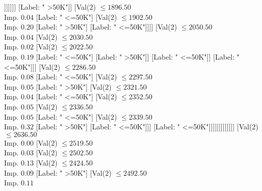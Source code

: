 \documentclass[margin=10pt]{standalone}
\begin{document}
\begin{forest}
																														[Label: " <=50K"]
																														[Val($2$) $ \leq 1851.50$ \\ Imp. $0.29$
																															[Label: " >50K"]
																															[Label: " <=50K"]]]]]]]
																									[Label: " >50K"]]
																								[Val($2$) $ \leq 1896.50$ \\ Imp. $0.04$
																									[Label: " <=50K"]
																									[Val($2$) $ \leq 1902.50$ \\ Imp. $0.20$
																										[Label: " >50K"]
																										[Label: " <=50K"]]]]
																							[Val($2$) $ \leq 2050.50$ \\ Imp. $0.04$
																								[Val($2$) $ \leq 2030.50$ \\ Imp. $0.02$
																									[Val($2$) $ \leq 2022.50$ \\ Imp. $0.19$
																										[Label: " <=50K"]
																										[Label: " >50K"]]
																									[Label: " <=50K"]]
																								[Label: " <=50K"]]]
																						[Val($2$) $ \leq 2286.50$ \\ Imp. $0.08$
																							[Label: " <=50K"]
																							[Val($2$) $ \leq 2297.50$ \\ Imp. $0.05$
																								[Label: " >50K"]
																								[Val($2$) $ \leq 2321.50$ \\ Imp. $0.04$
																									[Label: " <=50K"]
																									[Val($2$) $ \leq 2352.50$ \\ Imp. $0.05$
																										[Val($2$) $ \leq 2336.50$ \\ Imp. $0.05$
																											[Label: " <=50K"]
																											[Val($2$) $ \leq 2339.50$ \\ Imp. $0.32$
																												[Label: " >50K"]
																												[Label: " <=50K"]]]
																										[Label: " <=50K"]]]]]]]]]]]]]
														[Val($2$) $ \leq 2636.50$ \\ Imp. $0.00$
															[Val($2$) $ \leq 2519.50$ \\ Imp. $0.03$
																[Val($2$) $ \leq 2502.50$ \\ Imp. $0.13$
																	[Val($2$) $ \leq 2424.50$ \\ Imp. $0.09$
																		[Label: " >50K"]
																		[Val($2$) $ \leq 2492.50$ \\ Imp. $0.11$

\end{forest}
\end{document}
